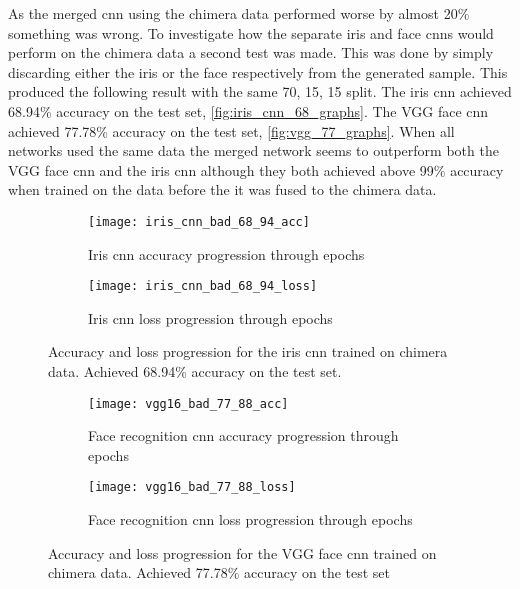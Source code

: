 \noindent As the merged \gls{cnn} using the chimera data performed worse by almost 20\% something was wrong. To investigate how the separate iris and face \gls{cnn}s would perform on the chimera data a second test was made. This was done by simply discarding either the iris or the face respectively from the generated sample. This produced the following result with the same 70, 15, 15 split.  The iris \gls{cnn} achieved 68.94\% accuracy on the test set, \autoref{fig:iris_cnn_68_graphs}. The VGG face \gls{cnn} achieved 77.78\% accuracy on the test set, \autoref{fig:vgg_77_graphs}. When all networks used the same data the merged network seems to outperform both the VGG face \gls{cnn} and the iris \gls{cnn} although they both achieved above 99\% accuracy when trained on the data before the it was fused to the chimera data.

\begin{figure}[H]
	\centering
	\begin{subfigure}{0.48\textwidth}
		\centering
		\texttt{[image: iris\_cnn\_bad\_68\_94\_acc]}
		\caption{Iris \gls{cnn} accuracy progression through epochs}
		\label{fig:iris_cnn_68_acc}
	\end{subfigure}
	\begin{subfigure}{0.48\textwidth}
		\centering
		\texttt{[image: iris\_cnn\_bad\_68\_94\_loss]}
		\caption{Iris \gls{cnn} loss progression through epochs}
		\label{fig:iris_cnn_68_loss}
	\end{subfigure}
	\caption{Accuracy and loss progression for the iris \gls{cnn} trained on chimera data. Achieved 68.94\% accuracy on the test set.}
	\label{fig:iris_cnn_68_graphs}
\end{figure}


\begin{figure}[H]
	\centering
	\begin{subfigure}{0.48\textwidth}
		\centering
		\texttt{[image: vgg16\_bad\_77\_88\_acc]}
		\caption{Face recognition \gls{cnn} accuracy progression through epochs}
		\label{fig:vgg_77_acc}
	\end{subfigure}
	\begin{subfigure}{0.48\textwidth}
		\centering
		\texttt{[image: vgg16\_bad\_77\_88\_loss]}
		\caption{Face recognition \gls{cnn} loss progression through epochs}
		\label{fig:vgg_77_loss}
	\end{subfigure}
	\caption{Accuracy and loss progression for the VGG face \gls{cnn} trained on chimera data. Achieved 77.78\% accuracy on the test set }
	\label{fig:vgg_77_graphs}
\end{figure}

